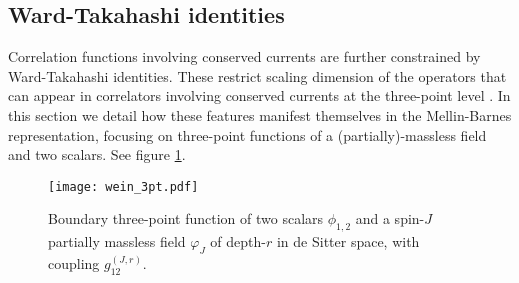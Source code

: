 \documentclass[11pt,a4paper]{article}
\begin{document}
\subsection{Ward-Takahashi identities}\label{sec:3ptWard}

Correlation functions involving conserved currents are further constrained by Ward-Takahashi identities. These restrict scaling dimension of the operators that can appear in correlators involving conserved currents at the three-point level \cite{Joung:2012rv,Joung:2012hz}. In this section we detail how these features manifest themselves in the Mellin-Barnes representation, focusing on three-point functions of a (partially)-massless field and two scalars. See figure \ref{fig::3pt}.

\begin{figure}[t]
    \centering
    \captionsetup{width=0.95\textwidth}
    \texttt{[image: wein\_3pt.pdf]}
    \caption{Boundary three-point function of two scalars $\phi_{1,2}$ and a spin-$J$ partially massless field $\varphi_J$ of depth-$r$ in de Sitter space, with coupling $g^{\left(J,r\right)}_{12}$.}
    \label{fig::3pt}
\end{figure}
\end{document}
